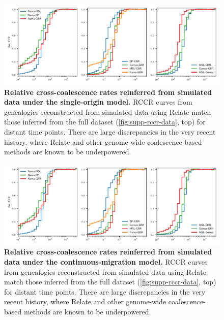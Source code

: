 \documentclass[]{article}
\begin{document}
\begin{figure}[ht]
    \centering
    \includegraphics[width=\textwidth]{figures/supp-relate-rccr-single-origin}
    \caption{
        \textbf{Relative cross-coalescence rates reinferred from simulated data
        under the single-origin model.} RCCR curves from genealogies
        reconstructed from simulated data using Relate match those inferred
        from the full dataset (\ref{fig:supp-rccr-data}, top) for distant
        time points. There are large discrepancies in the very recent history,
        where Relate and other genome-wide coalescence-based methods are known
        to be underpowered.
    }
    \label{fig:supp-rccr-single-origin}
\end{figure}

\begin{figure}[ht]
    \centering
    \includegraphics[width=\textwidth]{figures/supp-relate-rccr-continuous-migration}
    \caption{
        \textbf{Relative cross-coalescence rates reinferred from simulated data
        under the continuous-migration model.} RCCR curves from genealogies
        reconstructed from simulated data using Relate match those inferred
        from the full dataset (\ref{fig:supp-rccr-data}, top) for distant
        time points. There are large discrepancies in the very recent history,
        where Relate and other genome-wide coalescence-based methods are known
        to be underpowered.
    }
    \label{fig:supp-rccr-continuous-migration}
\end{figure}
\end{document}

